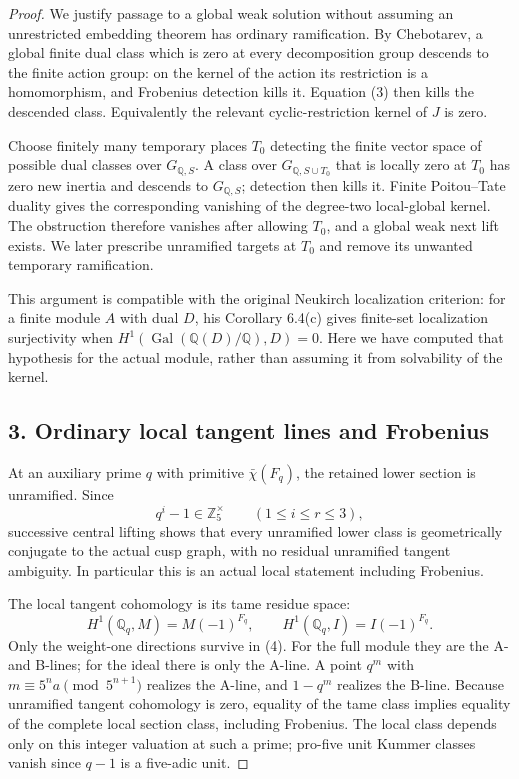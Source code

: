 \documentclass[11pt]{article}
\newcommand{\Z}{\mathbb Z}\newcommand{\F}{\mathbb F}\newcommand{\Q}{\mathbb Q}
\begin{document}
\begin{proof}
We justify passage to a global weak solution without assuming an unrestricted embedding theorem has ordinary ramification. By Chebotarev, a global finite dual class which is zero at every decomposition group descends to the finite action group: on the kernel of the action its restriction is a homomorphism, and Frobenius detection kills it. Equation (3) then kills the descended class. Equivalently the relevant cyclic-restriction kernel of $J$ is zero.

Choose finitely many temporary places $T_0$ detecting the finite vector space of possible dual classes over $G_{\Q,S}$. A class over $G_{\Q,S\cup T_0}$ that is locally zero at $T_0$ has zero new inertia and descends to $G_{\Q,S}$; detection then kills it. Finite Poitou--Tate duality gives the corresponding vanishing of the degree-two local-global kernel. The obstruction therefore vanishes after allowing $T_0$, and a global weak next lift exists. We later prescribe unramified targets at $T_0$ and remove its unwanted temporary ramification.

This argument is compatible with the original Neukirch localization criterion: for a finite module $A$ with dual $D$, his Corollary 6.4(c) gives finite-set localization surjectivity when $H^1(\operatorname{Gal}(\Q(D)/\Q),D)=0$. Here we have computed that hypothesis for the actual module, rather than assuming it from solvability of the kernel.

\subsection*{3. Ordinary local tangent lines and Frobenius}
At an auxiliary prime $q$ with primitive $\bar\chi(F_q)$, the retained lower section is unramified. Since
\[
 q^i-1\in\Z_5^\times\qquad(1\le i\le r\le3),
\]
successive central lifting shows that every unramified lower class is geometrically conjugate to the actual cusp graph, with no residual unramified tangent ambiguity. In particular this is an actual local statement including Frobenius.

The local tangent cohomology is its tame residue space:
\[
 H^1(\Q_q,M)=M(-1)^{F_q},\qquad
 H^1(\Q_q,I)=I(-1)^{F_q}.
 \tag{4}
\]
Only the weight-one directions survive in (4). For the full module they are the A- and B-lines; for the ideal there is only the A-line. A point $q^m$ with $m\equiv5^n a\pmod{5^{n+1}}$ realizes the A-line, and $1-q^m$ realizes the B-line. Because unramified tangent cohomology is zero, equality of the tame class implies equality of the complete local section class, including Frobenius. The local class depends only on this integer valuation at such a prime; pro-five unit Kummer classes vanish since $q-1$ is a five-adic unit.


\end{proof}
\end{document}
